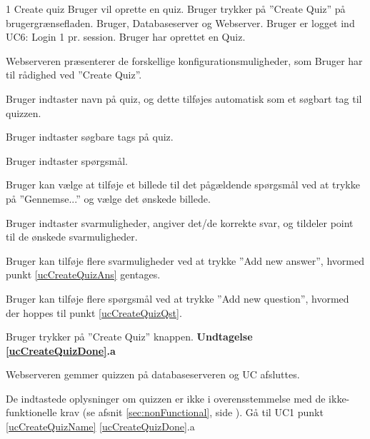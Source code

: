 
\uchead
	{1}
	{Create quiz}
	{Bruger vil oprette en quiz.}
	{Bruger trykker på ''Create Quiz'' på brugergrænsefladen.}
	{Bruger, Databaseserver og Webserver.}
	{Bruger er logget ind}
	{UC6: Login}
	{1 pr. session.}
	{Bruger har oprettet en Quiz.}

\item Webserveren præsenterer de forskellige konfigurationsmuligheder, som Bruger har til rådighed ved ''Create Quiz''.

\item \label{ucCreateQuizName} Bruger indtaster navn på quiz, og dette tilføjes automatisk som et søgbart tag til quizzen.

\item Bruger indtaster søgbare tags på quiz.

\item \label{ucCreateQuizQst} Bruger indtaster spørgsmål.

\item Bruger kan vælge at tilføje et billede til det pågældende spørgsmål ved at trykke på ''Gennemse...'' og vælge det ønskede billede.

\item \label{ucCreateQuizAns} Bruger indtaster svarmuligheder, angiver det/de korrekte svar, og tildeler point til de ønskede svarmuligheder.

\item Bruger kan tilføje flere svarmuligheder ved at trykke ''Add new answer'', hvormed punkt \ref{ucCreateQuizAns} gentages.

\item Bruger kan tilføje flere spørgsmål ved at trykke ''Add new question'', hvormed der hoppes til punkt \ref{ucCreateQuizQst}.

\item \label{ucCreateQuizDone} Bruger trykker på ''Create Quiz'' knappen.
\textbf{Undtagelse \ref{ucCreateQuizDone}.a}

\item \label{ucCreateQuizDB} Webserveren gemmer quizzen på databaseserveren og UC afsluttes.

\ucdescriptionend

\ucextension
	{De indtastede oplysninger om quizzen er ikke i overensstemmelse med de ikke-funktionelle krav (se afsnit \ref{sec:nonFunctional}, side \pageref{sec:nonFunctional}).}
	{Gå til UC1 punkt \ref{ucCreateQuizName}}
	{\ref{ucCreateQuizDone}.a}
		
